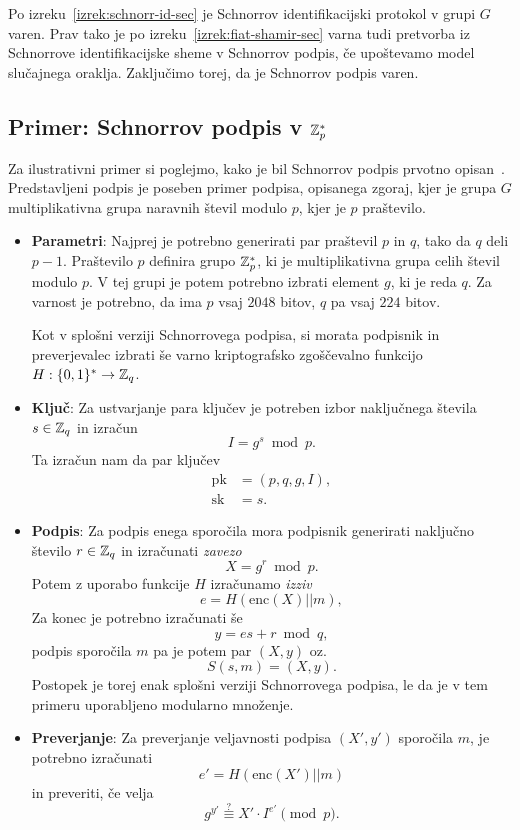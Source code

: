 \begin{dokaz}
    Po izreku~\ref{izrek:schnorr-id-sec} je Schnorrov identifikacijski protokol v grupi $G$ varen.
    Prav tako je po izreku~\ref{izrek:fiat-shamir-sec} varna tudi pretvorba iz Schnorrove identifikacijske
    sheme v Schnorrov podpis, če upoštevamo model slučajnega oraklja. Zaključimo torej, da je
    Schnorrov podpis varen.
\end{dokaz}

\subsection{Primer: Schnorrov podpis v \texorpdfstring{$\mathbb Z_p^*$}{Zp∗}}
Za ilustrativni primer si poglejmo, kako je bil Schnorrov podpis prvotno opisan~\cite{schnorr1989sig}.
Predstavljeni podpis je poseben primer podpisa, opisanega zgoraj, kjer je grupa $G$ multiplikativna
grupa naravnih števil modulo $p$, kjer je $p$ praštevilo.
\begin{itemize}
    \item \textbf{Parametri}:
    Najprej je potrebno generirati par praštevil $p$ in $q$, tako da $q$ deli $p - 1$. Praštevilo $p$
    definira grupo $\mathbb Z_p^*$, ki je multiplikativna grupa celih števil modulo $p$. V tej grupi je potem
    potrebno izbrati element $g$, ki je reda $q$. Za varnost je potrebno, da ima $p$ vsaj $2048$ bitov,
    $q$ pa vsaj $224$ bitov.

    Kot v splošni verziji Schnorrovega podpisa, si morata podpisnik in preverjevalec izbrati še varno
    kriptografsko zgoščevalno funkcijo $H : \{0, 1\}^* \rightarrow \mathbb Z_q$.

    \item \textbf{Ključ}:
    Za ustvarjanje para ključev je potreben izbor naključnega števila $s \in \mathbb Z_q$
    in izračun 
    $$ 
    I = g^s \bmod p.
    $$
    Ta izračun nam da par ključev
    \begin{align*}
    \text{pk} &= (p, q, g, I), \\
    \text{sk} &= s.
    \end{align*}

    \item \textbf{Podpis}:
    Za podpis enega sporočila mora podpisnik generirati naključno število $r \in \mathbb Z_q$ in izračunati 
    \textit{zavezo} 
    $$ 
    X = g^r \bmod p.
    $$ 
    Potem z uporabo funkcije $H$ izračunamo \textit{izziv} 
    $$
    e = H(\text{enc}(X) || m),
    $$
    Za konec je potrebno izračunati še 
    $$ 
    y = es + r \bmod q, 
    $$
    podpis sporočila $m$ pa je potem par $(X, y)$ oz.\ 
    $$ 
    S(s, m) = (X, y).
    $$
    Postopek je torej enak splošni verziji Schnorrovega podpisa, le da je v tem primeru uporabljeno
    modularno množenje.

    \item \textbf{Preverjanje}:
    Za preverjanje veljavnosti podpisa $(X', y')$ sporočila $m$, je potrebno izračunati 
    $$ 
    e' = H(\text{enc}(X') || m)
    $$
    in preveriti, če velja 
    \begin{equation}
        g^{y'} \stackrel{?}{\equiv} X' \cdot I^{e'} \pmod p. \label{eq:schnorr-ver}
    \end{equation}
\end{itemize}

